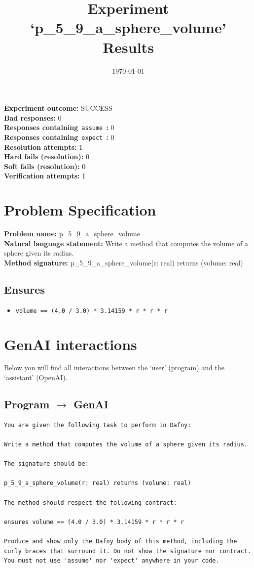 \documentclass{article}
\begin{document}
\title{Experiment `p\_5\_9\_a\_sphere\_volume' Results}
\author{\today}
\date{}
\maketitle
\textbf{Experiment outcome: }SUCCESS
\\\textbf{Bad responses: }0
\\\textbf{Responses containing}~\texttt{assume}~\textbf{: }0
\\\textbf{Responses containing}~\texttt{expect}~\textbf{: }0
\\\textbf{Resolution attempts: }1
\\\textbf{Hard fails (resolution): }0
\\\textbf{Soft fails (resolution): }0
\\\textbf{Verification attempts: }1
\section*{Problem Specification}
\textbf{Problem name: }p\_5\_9\_a\_sphere\_volume
\\\textbf{Natural language statement: }Write a method that computes the volume of a sphere given its radius.
\\\textbf{Method signature: }p\_5\_9\_a\_sphere\_volume(r: real) returns (volume: real)
\subsection*{Ensures}
\begin{itemize}
\item \texttt{volume == (4.0 / 3.0) * 3.14159 * r * r * r}
\end{itemize}
\clearpage
\section*{GenAI interactions}
Below you will find all interactions between the `user' (program) and the `assistant' (OpenAI).
\subsection*{Program $\rightarrow$ GenAI}
\begin{lstlisting}
You are given the following task to perform in Dafny:

Write a method that computes the volume of a sphere given its radius.

The signature should be:

p_5_9_a_sphere_volume(r: real) returns (volume: real)

The method should respect the following contract:

ensures volume == (4.0 / 3.0) * 3.14159 * r * r * r

Produce and show only the Dafny body of this method, including the curly braces that surround it. Do not show the signature nor contract. You must not use 'assume' nor 'expect' anywhere in your code.
\end{lstlisting}
\end{document}
